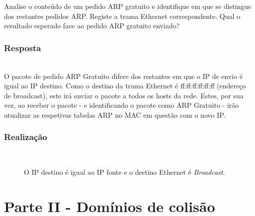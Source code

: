 \documentclass{llncs}
\begin{document}
Analise o conteúdo de um pedido ARP gratuito e identifique em que se distingue dos restantes pedidos ARP. Registe a trama Ethernet correspondente. Qual o resultado esperado face ao pedido ARP gratuito enviado?

\subsubsection{Resposta}\rule[-10pt]{0pt}{10pt}\\

O pacote de pedido ARP Gratuito difere dos restantes em que o IP de envio é igual ao IP destino. Como o destino da trama Ethernet é ff:ff:ff:ff:ff:ff (endereço de broadcast), este irá enviar o pacote a todos os hosts da rede. Estes, por sua vez, ao receber o pacote - e identificando o pacote como ARP Gratuito - irão atualizar as respetivas tabelas ARP no MAC em questão com o novo IP.

\subsubsection{Realização}\rule[-10pt]{0pt}{10pt}\\

\begin{figure}
	\caption{O IP destino é igual ao IP fonte e o destino Ethernet é \textit{Broadcast}.}
	\label{fig:arpg_ip}
\end{figure} 


\clearpage
\section{Parte II - Domínios de colisão}
\end{document}
